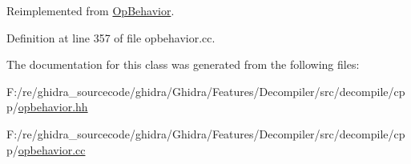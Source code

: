 Reimplemented from \mbox{\hyperlink{class_op_behavior_aeeed3af7aa35264b31a1f182884214a9}{Op\+Behavior}}.



Definition at line 357 of file opbehavior.\+cc.



The documentation for this class was generated from the following files\+:\begin{DoxyCompactItemize}
\item 
F\+:/re/ghidra\+\_\+sourcecode/ghidra/\+Ghidra/\+Features/\+Decompiler/src/decompile/cpp/\mbox{\hyperlink{opbehavior_8hh}{opbehavior.\+hh}}\item 
F\+:/re/ghidra\+\_\+sourcecode/ghidra/\+Ghidra/\+Features/\+Decompiler/src/decompile/cpp/\mbox{\hyperlink{opbehavior_8cc}{opbehavior.\+cc}}\end{DoxyCompactItemize}
